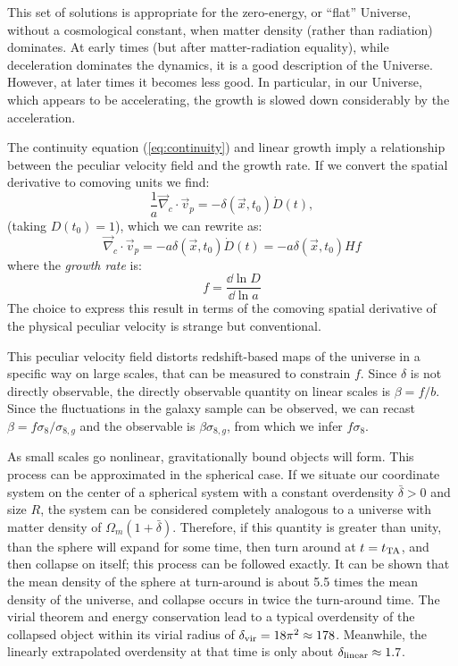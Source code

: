 This set of solutions is appropriate for the zero-energy, or ``flat''
Universe, without a cosmological constant, when matter density (rather
than radiation) dominates. At early times (but after matter-radiation
equality), while deceleration dominates the dynamics, it is a good
description of the Universe.  However, at later times it becomes less
good. In particular, in our Universe, which appears to be
accelerating, the growth is slowed down considerably by the
acceleration.

The continuity equation (\ref{eq:continuity}) and linear growth imply
a relationship between the peculiar velocity field and the growth
rate. If we convert the spatial derivative to comoving units we find:
\begin{equation}
\frac{1}{a} \vec\nabla_c\cdot\vec{v}_p = - \delta(\vec{x}, t_0) \dot
D(t),
\end{equation}
(taking $D(t_0) = 1$), which we can rewrite as:
\begin{equation}
\vec\nabla_c\cdot\vec{v}_p = - a \delta(\vec{x}, t_0) \dot  
D(t) = - a \delta(\vec{x}, t_0) H f
\end{equation}
where the {\it growth rate} is:
\begin{equation}
f = \frac{\dd \ln D}{\dd \ln a}
\end{equation}
The choice to express this result in terms of the comoving spatial
derivative of the physical peculiar velocity is strange but
conventional.

This peculiar velocity field distorts redshift-based maps of the
universe in a specific way on large scales, that can be measured to
constrain $f$. Since $\delta$ is not directly observable, the directly
observable quantity on linear scales is $\beta = f/b$. Since the
fluctuations in the galaxy sample can be observed, we can recast
$\beta = f \sigma_8 / \sigma_{8,g}$ and the observable is
$\beta \sigma_{8,g}$, from which we infer $f\sigma_8$.

As small scales go nonlinear, gravitationally bound objects will
form. This process can be approximated in the spherical case. If we
situate our coordinate system on the center of a spherical system with
a constant overdensity $\bar\delta > 0$ and size $R$, the system can
be considered completely analogous to a universe with matter density
of $\Omega_m(1+\bar\delta)$. Therefore, if this quantity is greater
than unity, than the sphere will expand for some time, then turn
around at $t=t_{\rm TA}$, and then collapse on itself; this process
can be followed exactly. It can be shown that the mean density of the
sphere at turn-around is about 5.5 times the mean density of the
universe, and collapse occurs in twice the turn-around time. The
virial theorem and energy conservation lead to a typical overdensity
of the collapsed object within its virial radius of $\delta_{\rm vir}
= 18\pi^2 \approx 178$. Meanwhile, the linearly extrapolated
overdensity at that time is only about $\delta_{\rm linear}\approx
1.7$.

